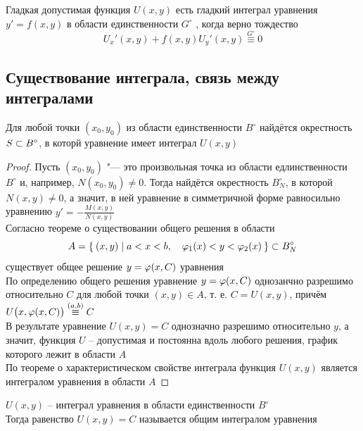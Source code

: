 \begin{implication}
    Гладкая допустимая функция $ U(x, y) $ есть гладкий интеграл уравнения  $ y' = f(x, y) $ в области единственности $ G^\circ $ , когда верно тождество
    $$ U_x'(x, y) + f(x, y)U_y'(x, y) \overset{G^\circ}\equiv 0 $$
\end{implication}

\subsection{Существование интеграла, связь между интегралами}

\begin{theorem}
    Для любой точки $ (x_0, y_0) $ из области единственности $ B^\circ $ найдётся окрестность $ S \subset B^\circ $, в которй уравнение  имеет интеграл $ U(x, y) $
\end{theorem}

\begin{proof}
    Пусть $ (x_0, y_0) $ "--- это произвольная точка из области едлинственности $ B^\circ $ и, например, $ N(x_0, y_0) \ne 0 $. Тогда найдётся окрестность $ B_N^\circ $, в которой $ N(x, y) \ne 0 $, а значит, в ней уравнение в симметричной форме  равносильно уравнению  $ y' = - \frac{M(x, y)}{N(x, y)} $ \\
    Согласно теореме о существовании общего решения в области
    $$ A = \Set{(x,y) | a < x < b, \quad \varphi_1(x) < y < \varphi_2(x)} \subset B_N^\circ $$
    существует общее решение $ y = \varphi(x, C) $ уравнения  \\
    По определению общего решения уравнение $ y = \varphi(x, C) $ однозанчно разрешимо относительно $ C $ для любой точки $ (x, y) \in A $, т. е. $ C = U(x, y) $, причём $ U \big( x, \vphi(x, C) \big) \overset{(a, b)}\equiv C $ \\
    В результате уравнение $ U(x, y) = C $ однозначно разрешимо относительно $ y $, а значит, функция $ U $ -- допустимая и постоянна вдоль любого решения, график которого лежит в области $ A $ \\
    По теореме о характеристическом свойстве интеграла функция $ U(x, y) $ является интегралом уравнения  в области $ A $
\end{proof}

\begin{definition}
    $ U(x, y) $ -- интеграл уравнения  в области единственности $ B^\circ $ \\
    Тогда равенство $ U(x, y) = C $ называется общим интегралом уравнения 
\end{definition}

